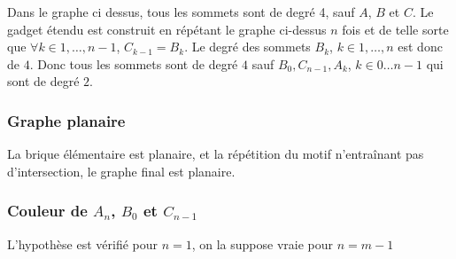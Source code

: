 Dans le graphe ci dessus, tous les sommets sont de degré 4, sauf $A$, $B$ et $C$. Le gadget étendu
est construit en répétant le graphe ci-dessus $n$ fois et de telle sorte que $\forall k \in 1, \dots,
n-1$, $C_{k-1} = B_k$. Le degré des sommets $B_k$, $k \in 1, \dots, n$ est donc de $4$. Donc tous
les sommets sont de degré $4$ sauf $B_0, C_{n-1}, A_k$, $k \in 0 \dots n-1$ qui sont de degré $2$.

\subsubsection{Graphe planaire}

La brique élémentaire est planaire, et la répétition du motif n'entraînant pas d'intersection, le
graphe final est planaire.

\subsubsection{Couleur de $A_n$, $B_0$ et $C_{n-1}$}

L'hypothèse est vérifié pour $n=1$, on la suppose vraie pour $n=m-1$
